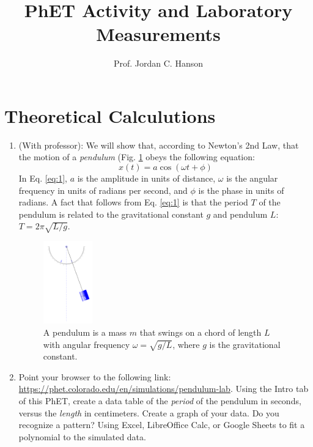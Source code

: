 \documentclass{article}
\begin{document}
\title{PhET Activity and Laboratory Measurements}
\author{Prof. Jordan C. Hanson}

\maketitle

\section{Theoretical Calculutions}

\begin{enumerate}
\item (With professor): We will show that, according to Newton's 2nd Law, that the motion of a \textit{pendulum} (Fig. \ref{fig:pendulum} obeys the following equation:
\begin{equation}
x(t) = a\cos(\omega t + \phi) \label{eq:1}
\end{equation} 
In Eq. \ref{eq:1}, $a$ is the amplitude in units of distance, $\omega$ is the angular frequency in units of radians per second, and $\phi$ is the phase in units of radians.  A fact that follows from Eq. \ref{eq:1} is that the period $T$ of the pendulum is related to the gravitational constant $g$ and pendulum $L$: $T = 2\pi \sqrt{L/g}$.
\begin{figure}[ht]
\centering
\includegraphics[width=0.2\textwidth]{pendulum.png}
\caption{\label{fig:pendulum} A pendulum is a mass $m$ that swings on a chord of length $L$ with angular frequency $\omega = \sqrt{g/L}$, where $g$ is the gravitational constant.}
\end{figure}
\item Point your browser to the following link: \url{https://phet.colorado.edu/en/simulations/pendulum-lab}.  Using the Intro tab of this PhET, create a data table of the \textit{period} of the pendulum in seconds, versus the \textit{length} in centimeters.  Create a graph of your data.  Do you recognize a pattern?  Using Excel, LibreOffice Calc, or Google Sheets to fit a polynomial to the simulated data.
\end{enumerate}
\end{document}
